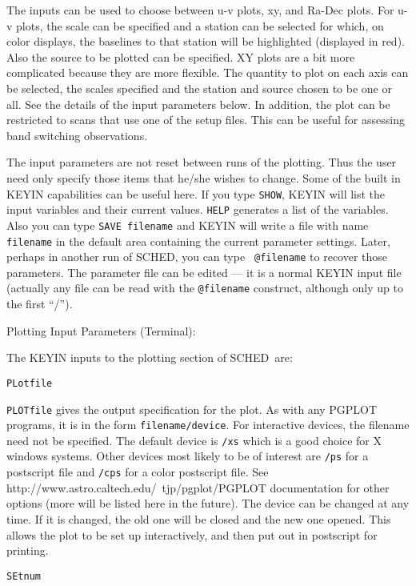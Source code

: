 \documentclass{report}
\newcommand{\sched}{{\sc SCHED}}
\newcommand{\schedb}{{\sc SCHED~}}
\begin{document}
The inputs can be used to choose between u-v plots, xy, and Ra-Dec
plots.  For u-v plots, the scale can be specified and a station can be
selected for which, on color displays, the baselines to that station
will be highlighted (displayed in red).  Also the source to be plotted
can be specified.  XY plots are a bit more complicated because they
are more flexible.  The quantity to plot on each axis can be selected,
the scales specified and the station and source chosen to be one or
all.  See the details of the input parameters below.  In addition, the
plot can be restricted to scans that use one of the setup files.  This
can be useful for assessing band switching observations.

The input parameters are not reset between runs of the plotting.  Thus
the user need only specify those items that he/she wishes to change.
Some of the built in KEYIN capabilities can be useful here.  If you
type {\tt SHOW}, KEYIN will list the input variables and their current
values.  {\tt HELP} generates a list of the variables.  Also you can
type {\tt SAVE filename} and KEYIN will write a file with name {\tt
filename} in the default area containing the current parameter
settings.  Later, perhaps in another run of \sched, you can type {\tt
@filename} to recover those parameters.  The parameter file can be
edited --- it is a normal KEYIN input file (actually any file can be
read with the {\tt @filename} construct, although only up to the first
``/'').

Plotting Input Parameters (Terminal):

The KEYIN inputs to the plotting section of \schedb are:

{\tt PLotfile}

{\tt PLOTfile} gives the output specification for the plot.  As with
any {\sc PGPLOT} programs, it is in the form {\tt filename/device}.
For interactive devices, the filename need not be specified.  The
default device is {\tt /xs} which is a good choice for X windows systems.
Other devices most likely to be of interest are {\tt /ps} for a postscript
file and {\tt /cps} for a color postscript file.  See
{http://www.astro.caltech.edu/~tjp/pgplot/}{\sc PGPLOT}
documentation for other options (more will be listed here in the future).
The device can be changed at any time.
If it is changed, the old one will be closed and the new one opened.  This
allows the plot to be set up interactively, and then put out in postscript
for printing.

{\tt SEtnum}
\end{document}
